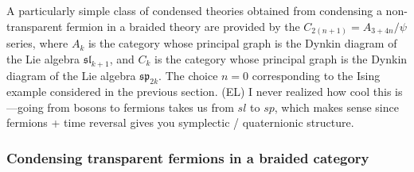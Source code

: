 \documentclass[12pt,a4paper]{article}
\newcommand{\kw}[1]{{\color{kwcolor}\footnotesize{(KW) #1}}}
\newcommand{\dave}[1]{{\color{ao(english)}\footnotesize{(DA) #1}}}
\newcommand{\ethan}[1]{{\color{amethyst}\footnotesize{(EL) #1}}}
\begin{document}
\medskip


A particularly simple class of condensed theories obtained from condensing a non-
transparent fermion in a braided theory are provided by the $C_{2(n+1)} = A_{3+4n} / \psi$ series, 
where $A_k$ is the category whose principal graph is the Dynkin diagram of the Lie algebra $\mathfrak{sl}_{k+1}$, 
and $C_k$ is the category whose principal graph is the Dynkin 
diagram of the Lie algebra $\mathfrak{sp}_{2k}$.
The choice $n=0$ 
corresponding to the Ising example considered in the previous section. 
\ethan{I never realized how cool this is---going from bosons to fermions takes us from $sl$ to $sp$, 
which makes sense since fermions + time reversal gives you symplectic / quaternionic structure. }


\subsubsection{Condensing transparent fermions in a braided category}
\label{condense_transparent_fermion}
\end{document}
